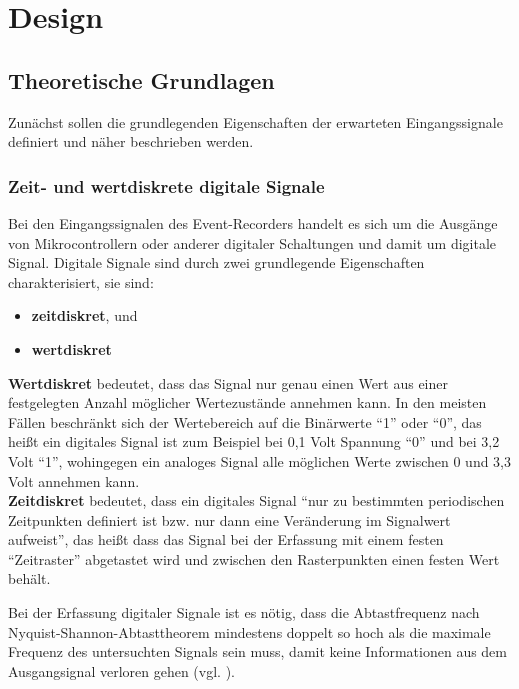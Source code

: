 \chapter{Design}
\label{ch:Design}

\section{Theoretische Grundlagen}

Zunächst sollen die grundlegenden Eigenschaften der erwarteten Eingangssignale definiert und näher beschrieben werden. 

\subsection{Zeit- und wertdiskrete digitale Signale}

Bei den Eingangssignalen des Event-Recorders handelt es sich um die Ausgänge von Mikrocontrollern oder anderer digitaler Schaltungen und damit um digitale Signal.
Digitale Signale sind durch zwei grundlegende Eigenschaften charakterisiert, sie sind:
\begin{itemize}
	\item \textbf{zeitdiskret}, und
	\item \textbf{wertdiskret}
\end{itemize}
\textbf{Wertdiskret} bedeutet, dass das Signal nur genau einen Wert aus einer festgelegten Anzahl möglicher Wertezustände annehmen kann.
In den meisten Fällen beschränkt sich der Wertebereich auf die Binärwerte ``1'' oder ``0'', das heißt ein digitales Signal ist zum Beispiel bei 0,1 Volt Spannung ``0'' und bei 3,2 Volt ``1'', wohingegen ein analoges Signal alle möglichen Werte zwischen 0 und 3,3 Volt annehmen kann.\\

\textbf{Zeitdiskret} bedeutet, dass ein digitales Signal ``nur zu bestimmten periodischen Zeitpunkten definiert ist bzw. nur dann eine Veränderung im Signalwert aufweist''\cite{wiki:Digitalsignal}, das heißt dass das Signal bei der Erfassung mit einem festen ``Zeitraster'' abgetastet wird und zwischen den Rasterpunkten einen festen Wert behält.

Bei der Erfassung digitaler Signale ist es nötig, dass die Abtastfrequenz nach Nyquist-Shannon-Abtasttheorem mindestens doppelt so hoch als die maximale Frequenz des untersuchten Signals sein muss, damit keine Informationen aus dem Ausgangsignal verloren gehen (vgl. \cite{wiki:Digitalsignal}).

